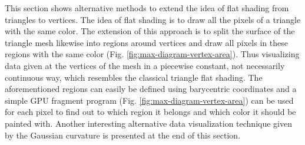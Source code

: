 \label{section:vertex-area-chapter}
This section shows alternative methods to extend the idea of flat shading from triangles to vertices. The idea of flat shading is to draw all the pixels of a triangle with the same color. The extension of this approach is to split the surface of the triangle mesh likewise into regions around vertices and draw all pixels in these regions with the same color (Fig. \ref{fig:max-diagram-vertex-area}). Thus visualizing data given at the vertices of the mesh in a piecewise constant, not necessarily continuous way, which resembles the classical triangle flat shading. The aforementioned regions can easily be defined using barycentric coordinates and a simple GPU fragment program (Fig. \ref{fig:max-diagram-vertex-area}) can be used for each pixel to find out to which region it belongs and which color it should be painted with. Another interesting alternative data visualization technique given by the Gaussian curvature is presented at the end of this section.



